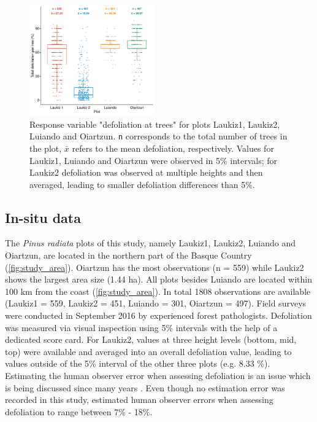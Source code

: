 \documentclass[final]{IEEEtran}
\begin{document}
\begin{figure} [t!]
	\centering
	\begin{center}
		\includegraphics[width=0.48\textwidth] {defoliation-distribution-plot-1.pdf}
		\caption{Response variable "defoliation at trees" for plots Laukiz1, Laukiz2, Luiando and Oiartzun. \texttt{n} corresponds to the total number of trees in the plot, $\bar{x}$ refers to the mean defoliation, respectively. Values for Laukiz1, Luiando and Oiartzun were observed in 5\% intervals; for Laukiz2 defoliation was observed at multiple heights and then averaged, leading to smaller defoliation differences than 5\%.}\label{fig:defol-distr}
	\end{center}
\end{figure}

\subsection{In-situ data}

The \textit{Pinus radiata} plots of this study, namely Laukiz1, Laukiz2, Luiando and Oiartzun, are located in the northern part of the Basque Country (\autoref{fig:study_area}).
Oiartzun has the most observations (n = 559) while Laukiz2 shows the largest area size (1.44 ha).
All plots besides Luiando are located within 100 km from the coast (\autoref{fig:study_area}).
In total 1808 observations are available (Laukiz1 = 559, Laukiz2 = 451, Luiando = 301, Oiartzun = 497).
Field surveys were conducted in September 2016 by experienced forest pathologists.
Defoliation was measured via visual inspection using 5\% intervals with the help of a dedicated score card.
For Laukiz2, values at three height levels (bottom, mid, top) were available and averaged into an overall defoliation value, leading to values outside of the 5\% interval of the other three plots (e.g. 8.33 \%).
Estimating the human observer error when assessing defoliation is an issue which is being discussed since many years \cite{innes1993}.
Even though no estimation error was recorded in this study, \cite{maclean1982} estimated human observer errors when assessing defoliation to range between 7\% - 18\%.
\end{document}
